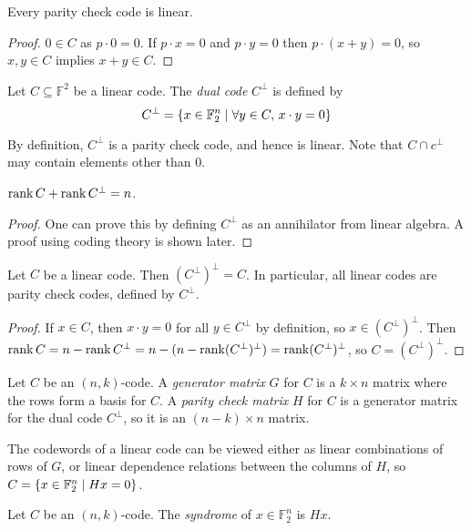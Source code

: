 \begin{lemma}
    Every parity check code is linear.
\end{lemma}
\begin{proof}
    \( 0 \in C \) as \( p \cdot 0 = 0 \).
    If \( p \cdot x = 0 \) and \( p \cdot y = 0 \) then \( p \cdot (x + y) = 0 \), so \( x, y \in C \) implies \( x + y \in C \).
\end{proof}
\begin{definition}
    Let \( C \subseteq \mathbb F^2 \) be a linear code.
    The \emph{dual code} \( C^\perp \) is defined by
    \[ C^\perp = \qty{x \in \mathbb F_2^n \mid \forall y \in C,\, x \cdot y = 0} \]
\end{definition}
By definition, \( C^\perp \) is a parity check code, and hence is linear.
Note that \( C \cap c^\perp \) may contain elements other than 0.
\begin{lemma}
    \( \rank C + \rank C^\perp = n \).
\end{lemma}
\begin{proof}
    One can prove this by defining \( C^\perp \) as an annihilator from linear algebra.
    A proof using coding theory is shown later.
\end{proof}
\begin{corollary}
    Let \( C \) be a linear code.
    Then \( (C^\perp)^\perp = C \).
    In particular, all linear codes are parity check codes, defined by \( C^\perp \).
\end{corollary}
\begin{proof}
    If \( x \in C \), then \( x \cdot y = 0 \) for all \( y \in C^\perp \) by definition, so \( x \in (C^\perp)^\perp \).
    Then \( \rank C = n - \rank C^\perp = n - (n - \rank (C^\perp)^\perp) = \rank (C^\perp)^\perp \), so \( C = (C^\perp)^\perp \).
\end{proof}
\begin{definition}
    Let \( C \) be an \( (n,k) \)-code.
    A \emph{generator matrix} \( G \) for \( C \) is a \( k \times n \) matrix where the rows form a basis for \( C \).
    A \emph{parity check matrix} \( H \) for \( C \) is a generator matrix for the dual code \( C^\perp \), so it is an \( (n-k) \times n \) matrix.
\end{definition}
The codewords of a linear code can be viewed either as linear combinations of rows of \( G \), or linear dependence relations between the columns of \( H \), so \( C = \qty{x \in \mathbb F_2^n \mid H x = 0} \).
\begin{definition}
    Let \( C \) be an \( (n, k) \)-code.
    The \emph{syndrome} of \( x \in \mathbb F_2^n \) is \( Hx \).
\end{definition}
